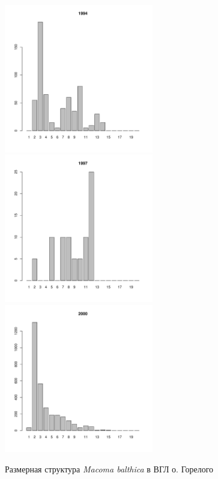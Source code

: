 \documentclass[12pt, a4paper]{article}
\begin{document}
\begin{figure}[h]
\begin{multicols}{3}
\hfill
\includegraphics[width=65mm]{../White_Sea/Luvenga_Goreliy/high_1994_.pdf}
\hfill
\includegraphics[width=65mm]{../White_Sea/Luvenga_Goreliy/high_1997_.pdf}
\hfill
\includegraphics[width=65mm]{../White_Sea/Luvenga_Goreliy/high_2000_.pdf}
\end{multicols}



\caption{Размерная структура {\it Macoma balthica} в ВГЛ о. Горелого}
\label{ris:size_str_Goreliy_high}
\end{figure}
\end{document}
